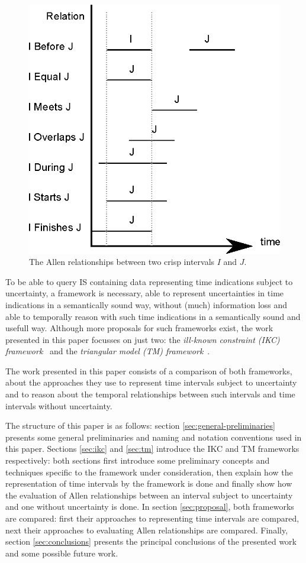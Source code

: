 \begin{figure}[h]
   \centering
   \includegraphics[width=0.8\columnwidth]{graphs/allen.eps}
   \caption{The Allen relationships between two crisp intervals $I$ and $J$.  }
   \label{fig:allen-relationships}
 \end{figure}

To be able to query IS containing data representing time indications subject to uncertainty, a framework is necessary, able to represent uncertainties in time indications in a semantically sound way, without (much) information loss and able to temporally reason with such time indications in a semantically sound and usefull way. Although more proposals for such frameworks exist, the work presented in this paper focusses on just two: the \emph{ill-known constraint \emph{(IKC)} framework}~\cite{Pons2011} and the \emph{triangular model \emph{(TM)} framework}~\cite{DeTre2012}.

The work presented in this paper consists of a comparison of both frameworks, about the approaches they use to represent time intervals subject to uncertainty and to reason about the temporal relationships between such intervals and time intervals without uncertainty.

The structure of this paper is as follows: section \ref{sec:general-preliminaries} presents some general preliminaries and naming and notation conventions used in this paper. Sections \ref{sec:ikc} and \ref{sec:tm} introduce the IKC and TM frameworks respectively: both sections first introduce some preliminary concepts and techniques specific to the framework under consideration, then explain how the representation of time intervals by the framework is done and finally show how the evaluation of Allen relationships between an interval subject to uncertainty and one without uncertainty is done. In section \ref{sec:proposal}, both frameworks are compared: first their approaches to representing time intervals are compared, next their approaches to evaluating Allen relationships are compared. Finally, section \ref{sec:conclusions} presents the principal conclusions of the presented work and some possible future work. 

